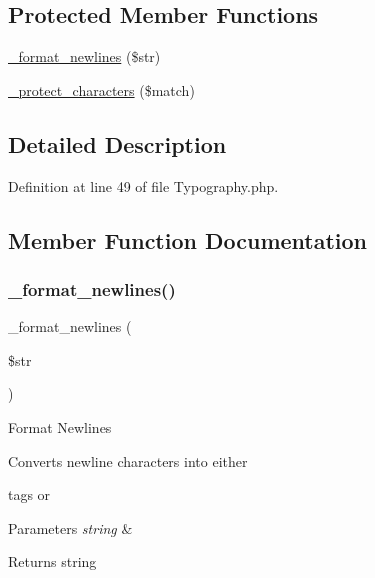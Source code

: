 \subsection*{Protected Member Functions}
\begin{DoxyCompactItemize}
\item 
\mbox{\hyperlink{class_c_i___typography_ac3384cbfc88fcd17e40624bdd6002801}{\+\_\+format\+\_\+newlines}} (\$str)
\item 
\mbox{\hyperlink{class_c_i___typography_a03e8f97de4301e0fe0cf0e9f0bcd936c}{\+\_\+protect\+\_\+characters}} (\$match)
\end{DoxyCompactItemize}


\subsection{Detailed Description}


Definition at line 49 of file Typography.\+php.



\subsection{Member Function Documentation}
\mbox{\label{class_c_i___typography_ac3384cbfc88fcd17e40624bdd6002801}} 
\subsubsection{\texorpdfstring{\_format\_newlines()}{\_format\_newlines()}}
{\footnotesize\ttfamily \+\_\+format\+\_\+newlines (\begin{DoxyParamCaption}\item[{}]{\$str }\end{DoxyParamCaption})\hspace{0.3cm}{\ttfamily [protected]}}

Format Newlines

Converts newline characters into either 

tags or ~\newline



\begin{DoxyParams}{Parameters}
{\em string} & \\
\hline
\end{DoxyParams}
\begin{DoxyReturn}{Returns}
string 
\end{DoxyReturn}


